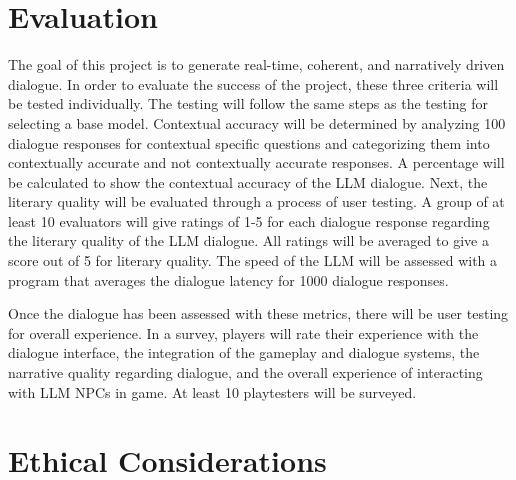 \documentclass[10pt,twocolumn]{article}
\begin{document}
        \subsubsection{}

            \par
            

        \subsubsection{}

            \par

        
\section{Evaluation}

    \par 
    The goal of this project is to generate real-time, coherent, and narratively driven dialogue. In order to evaluate the success of the project, these three criteria will be tested individually. The testing will follow the same steps as the testing for selecting a base model. Contextual accuracy will be determined by analyzing 100 dialogue responses for contextual specific questions and categorizing them into contextually accurate and not contextually accurate responses. A percentage will be calculated to show the contextual accuracy of the LLM dialogue. Next, the literary quality will be evaluated through a process of user testing. A group of at least 10 evaluators will give ratings of 1-5 for each dialogue response regarding the literary quality of the LLM dialogue. All ratings will be averaged to give a score out of 5 for literary quality. The speed of the LLM will be assessed with a program that averages the dialogue latency for 1000 dialogue responses.

    \par
    Once the dialogue has been assessed with these metrics, there will be user testing for overall experience. In a survey, players will rate their experience with the dialogue interface, the integration of the gameplay and dialogue systems, the narrative quality regarding dialogue, and the overall experience of interacting with LLM NPCs in game. At least 10 playtesters will be surveyed. 

\section{Ethical Considerations}
\end{document}
